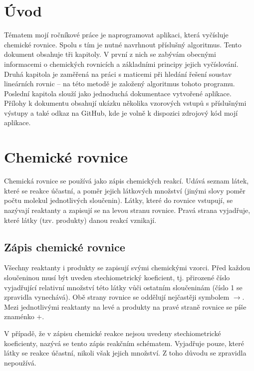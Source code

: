 \documentclass[12pt,a4paper]{report}
\newcommand{\s}{$ \rightarrow $}
\begin{document}


\tableofcontents

\chapter{Úvod}
Tématem mojí ročníkové práce je naprogramovat aplikaci, která vyčísluje chemické rovnice. Spolu s tím je nutné navrhnout příslušný algoritmus. Tento dokument obsahuje tři kapitoly. V první z nich se zabývám obecnými informacemi o chemických rovnicích a základními principy jejich vyčíslování. Druhá kapitola je zaměřená na práci s maticemi při hledání řešení soustav lineárních rovnic -- na této metodě je založený algoritmus tohoto programu. Poslední kapitola slouží jako jednoduchá dokumentace vytvořené aplikace. Přílohy k dokumentu obsahují ukázku několika vzorových vstupů s příslušnými výstupy a také odkaz na GitHub, kde je volně k dispozici zdrojový kód mojí aplikace.

\chapter{Chemické rovnice}
Chemická rovnice se používá jako zápis chemických reakcí. Udává seznam látek, které se reakce účastní, a poměr jejich látkových množství (jinými slovy poměr počtu molekul jednotlivých sloučenin). Látky, které do rovnice vstupují, se nazývají reaktanty a zapisují se na levou stranu rovnice. Pravá strana vyjadřuje, které látky (tzv. produkty) danou reakcí vznikají. \cite{wiki}

\section{Zápis chemické rovnice}
Všechny reaktanty i produkty se zapisují svými chemickými vzorci. Před každou sloučeninou musí být uveden stechiometrický koeficient, tj. přirozené číslo vyjadřující relativní množství této látky vůči ostatním sloučeninám (číslo 1 se zpravidla vynechává). Obě strany rovnice se oddělují nejčastěji symbolem \s. Mezi jednotlivými reaktanty na levé a produkty na pravé straně rovnice se píše znaménko $ + $. \cite{wiki}

V případě, že v zápisu chemické reakce nejsou uvedeny stechiometrické koeficienty, nazývá se tento zápis reakčním schématem. Vyjadřuje pouze, které látky se reakce účastní, nikoli však jejich množství. Z toho důvodu se zpravidla nepoužívá. \cite{uch}
\end{document}
